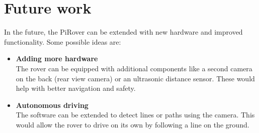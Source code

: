 \section{Future work}


In the future, the PiRover can be extended with new hardware and improved functionality. Some possible ideas are:

\begin{itemize}
    \item \textbf{Adding more hardware} \\
    The rover can be equipped with additional components like a second camera on the back (rear view camera) or an ultrasonic distance sensor. These would help with better navigation and safety.

    \item \textbf{Autonomous driving} \\
    The software can be extended to detect lines or paths using the camera. This would allow the rover to drive on its own by following a line on the ground.
\end{itemize}
